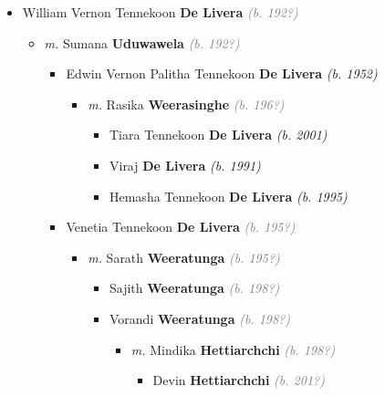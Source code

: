 \documentclass[10pt, openany]{book}
\begin{document}
\begin{itemize}
{\begin{itemize}
{   }
\item{William Vernon Tennekoon \textbf{De Livera} \textcolor{gray}{\textit{(b. 192?)}}
\begin{itemize}
\item{\textit{m.} Sumana \textbf{Uduwawela} \textcolor{gray}{\textit{(b. 192?)}}   \label{couple:00001110:00001111} \begin{itemize}
\item{Edwin Vernon Palitha Tennekoon \textbf{De Livera} \textcolor{slorange}{\textit{(b. 1952)}}
\begin{itemize}
\item{\textit{m.} Rasika \textbf{Weerasinghe} \textcolor{gray}{\textit{(b. 196?)}}   \label{couple:00001121:00001122} \begin{itemize}
\item{Tiara Tennekoon \textbf{De Livera} \textcolor{slorange}{\textit{(b. 2001)}}
   }
\item{Viraj \textbf{De Livera} \textcolor{slorange}{\textit{(b. 1991)}}
  }
\item{Hemasha Tennekoon \textbf{De Livera} \textcolor{slorange}{\textit{(b. 1995)}}
   }
\end{itemize}}
\end{itemize}
     }
\item{Venetia Tennekoon \textbf{De Livera} \textcolor{gray}{\textit{(b. 195?)}}
\begin{itemize}
\item{\textit{m.} Sarath \textbf{Weeratunga} \textcolor{gray}{\textit{(b. 195?)}}   \label{couple:00001112:00001113} \begin{itemize}
\item{Sajith \textbf{Weeratunga} \textcolor{gray}{\textit{(b. 198?)}}
 }
\item{Vorandi \textbf{Weeratunga} \textcolor{gray}{\textit{(b. 198?)}}
\begin{itemize}
\item{\textit{m.} Mindika \textbf{Hettiarchchi} \textcolor{gray}{\textit{(b. 198?)}}   \label{couple:00001114:00001115} \begin{itemize}
\item{Devin \textbf{Hettiarchchi} \textcolor{gray}{\textit{(b. 201?)}}
}
\end{itemize}}
\end{itemize}}
\end{itemize}}
\end{itemize}}
\end{itemize}}
\end{itemize}}
\end{itemize}}
\end{itemize}
\end{document}
